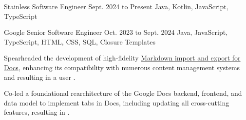 

\begin{cventry}
    {Stainless}
    {Software Engineer}
    {Sept. 2024 to Present}
    {Java, Kotlin, JavaScript, TypeScript}
    \vspace{-0.5em}
\end{cventry}

\begin{cventry}
    {Google}
    {Senior Software Engineer}
    {Oct. 2023 to Sept. 2024}
    {Java, JavaScript, TypeScript, HTML, CSS, SQL, Closure Templates}
    \begin{cvitems}
        \item Spearheaded the development of high-fidelity \href{https://workspaceupdates.googleblog.com/2024/07/import-and-export-markdown-in-google-docs.html}{Markdown import and export for Docs}, enhancing its compatibility with numerous content management systems and resulting in a user . 
        \item Co-led a foundational rearchitecture of the Google Docs backend, frontend, and data model to implement tabs in Docs, including updating all cross-cutting features, resulting in .
    \end{cvitems}
\end{cventry}

